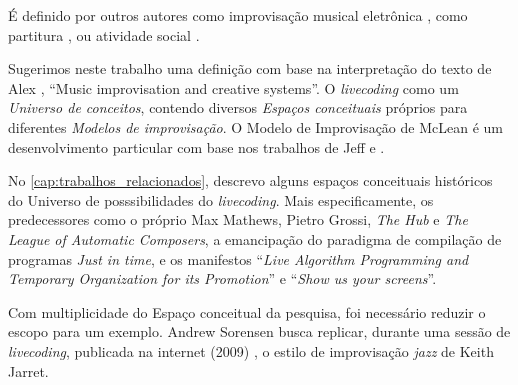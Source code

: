 É definido por outros autores como improvisação musical eletrônica \cite{collins_origins_2014}, como partitura \cite{magnusson_algorithms_2011}, ou atividade social \cite{mori_analysing_2015,prospero_social_2015}.  

Sugerimos neste trabalho uma definição com base na interpretação do texto de Alex , ``Music improvisation and creative systems''. O \emph{livecoding} como um \emph{Universo de conceitos}, contendo diversos \emph{Espaços conceituais} próprios para diferentes \emph{Modelos de improvisação}. O Modelo de Improvisação de McLean é um desenvolvimento particular com base nos trabalhos de Jeff  e . 

No \autoref{cap:trabalhos_relacionados}, descrevo alguns espaços conceituais históricos do Universo de posssibilidades do \emph{livecoding}. Mais especificamente, os predecessores como o próprio Max Mathews, Pietro Grossi, \emph{The Hub} e \emph{The League of Automatic Composers}, a emancipação do paradigma de compilação de programas \emph{Just in time}, e os manifestos ``\emph{Live Algorithm Programming and Temporary Organization for its Promotion}'' e ``\emph{Show us your screens}''.

Com multiplicidade do Espaço conceitual da pesquisa, foi necessário reduzir o escopo para um exemplo. Andrew Sorensen busca replicar, durante uma sessão de \emph{livecoding}, publicada na internet (2009) , o estilo de improvisação \emph{jazz} de Keith Jarret. 